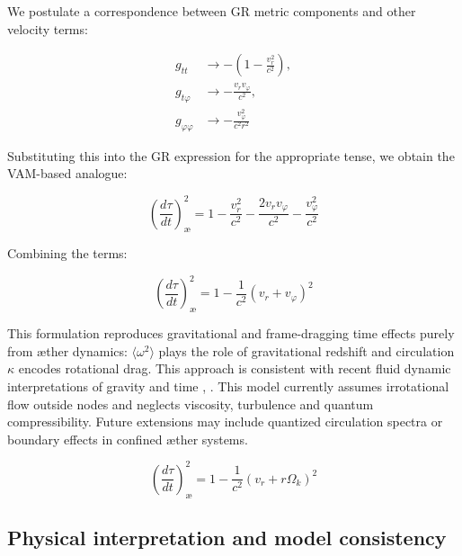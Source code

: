 We postulate a correspondence between GR metric components and other velocity terms:

\begin{equation}
 \begin{aligned}
  g_{tt} &\rightarrow -\left(1 - \frac{v_r^2}{c^2}\right), \\
  g_{t\varphi} &\rightarrow -\frac{v_r v_\varphi}{c^2}, \\
  g_{\varphi\varphi} &\rightarrow -\frac{v_\varphi^2}{c^2 r^2}
 \end{aligned}
 \label{eq:VAM_metric_terms}
\end{equation}

Substituting this into the GR expression for the appropriate tense, we obtain the VAM-based analogue:

\begin{equation}
 \left( \frac{d\tau}{dt} \right)^2_\text{\ae} = 1 - \frac{v_r^2}{c^2} - \frac{2v_r v_\varphi}{c^2} - \frac{v_\varphi^2}{c^2}
 \label{eq:VAM_proper_time}
\end{equation}

Combining the terms:

\begin{equation}
 \left( \frac{d\tau}{dt} \right)^2_\text{\ae} = 1 - \frac{1}{c^2}(v_r + v_\varphi)^2
 \label{eq:VAM_proper_time_combined}
\end{equation}

This formulation reproduces gravitational and frame-dragging time effects purely from æther dynamics: $\langle \omega^2 \rangle$ plays the role of gravitational redshift and circulation $\kappa$ encodes rotational drag. This approach is consistent with recent fluid dynamic interpretations of gravity and time \cite{barcelo2011analogue}, \cite{fedi2017gravity}.
This model currently assumes irrotational flow outside nodes and neglects viscosity, turbulence and quantum compressibility. Future extensions may include quantized circulation spectra or boundary effects in confined æther systems.

\begin{equation}
 \boxed{\left( \frac{d\tau}{dt} \right)^2_\text{\ae} = 1 - \frac{1}{c^2}(v_r + r\Omega_k)^2}
 \label{eq:VAM_proper_time_final}
\end{equation}

\subsection{Physical interpretation and model consistency}

